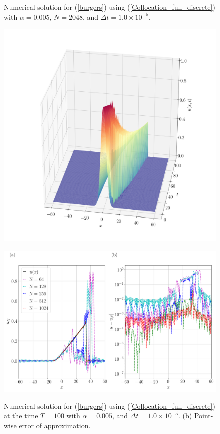	
	\begin{figure}[H]
		\centering
		\caption{Numerical solution for (\ref{burgers}) using (\ref{Collocation_full_discrete}) with $\alpha = 0.005$, $N=2048$, and $\Delta t = 1.0 \times 10^{-5}$.}
		\includegraphics[width=12cm]{Figures/Collocation/Graphics/eps=0.005/Numerical_Solution_alpha=0005.png}
		\label{Collocation_alpha=005}
		\caption{Numerical solution for (\ref{burgers}) using (\ref{Collocation_full_discrete}) at the time $T = 100$ with $\alpha = 0.005$, and $\Delta t = 1.0 \times 10^{-5}$. (b) Point-wise error of approximation.}
		\includegraphics[width=12.5cm]{Figures/Collocation/Graphics/eps=0.005/Numerical_Solution_alpha=0005_T=100.png}
		\label{Collocation_alpha=005_T}
	\end{figure}
	
